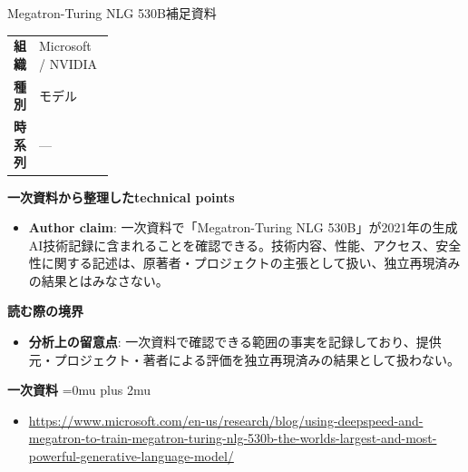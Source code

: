 \begin{technicalnote}{Megatron-Turing NLG 530B}{補足資料}
\begingroup
\begin{tabularx}{\linewidth}{@{}>{\bfseries}p{0.22\linewidth}X@{}}
組織 & Microsoft / NVIDIA \\
種別 & モデル \\
時系列 & — \\
\end{tabularx}
\smallskip
{\bfseries 一次資料から整理したtechnical points}
\begin{itemize}[leftmargin=1.5em,itemsep=0.35em]
\item \textbf{Author claim}: 一次資料で「Megatron-Turing NLG 530B」が2021年の生成AI技術記録に含まれることを確認できる。技術内容、性能、アクセス、安全性に関する記述は、原著者・プロジェクトの主張として扱い、独立再現済みの結果とはみなさない。
\end{itemize}
\begin{minipage}{\linewidth}
{\bfseries 読む際の境界}
\begin{itemize}[leftmargin=1.5em,itemsep=0.35em]
\item \textbf{分析上の留意点}: 一次資料で確認できる範囲の事実を記録しており、提供元・プロジェクト・著者による評価を独立再現済みの結果として扱わない。
\end{itemize}
\begin{samepage}
{\bfseries 一次資料}
\begingroup\sloppy
\Urlmuskip=0mu plus 2mu\relax
\begin{itemize}[leftmargin=1.5em,itemsep=0.25em]
\item {\scriptsize\url{https://www.microsoft.com/en-us/research/blog/using-deepspeed-and-megatron-to-train-megatron-turing-nlg-530b-the-worlds-largest-and-most-powerful-generative-language-model/}}
\end{itemize}
\endgroup
\end{samepage}
\end{minipage}
\endgroup
\end{technicalnote}
\medskip

